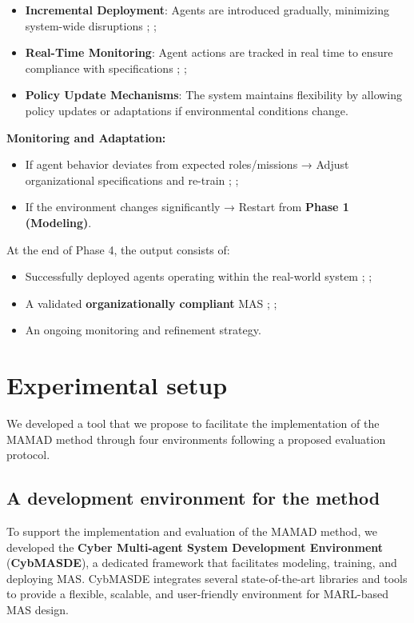 \documentclass[pdflatex,sn-mathphys-num]{sn-jnl}%
\theoremstyle{thmstyleone}%
\theoremstyle{thmstyletwo}%
\theoremstyle{thmstylethree}%
\begin{document}
\begin{itemize}
    \item \textbf{Incremental Deployment}: Agents are introduced gradually, minimizing system-wide disruptions ; ;
    \item \textbf{Real-Time Monitoring}: Agent actions are tracked in real time to ensure compliance with specifications ; ;
    \item \textbf{Policy Update Mechanisms}: The system maintains flexibility by allowing policy updates or adaptations if environmental conditions change.
\end{itemize}

\noindent \textbf{Monitoring and Adaptation:}
\begin{itemize}
    \item If agent behavior deviates from expected roles/missions → Adjust organizational specifications and re-train ; ;
    \item If the environment changes significantly → Restart from \textbf{Phase 1 (Modeling)}.
\end{itemize}

At the end of Phase 4, the output consists of:
\begin{itemize}
    \item Successfully deployed agents operating within the real-world system ; ;
    \item A validated \textbf{organizationally compliant} MAS ; ;
    \item An ongoing monitoring and refinement strategy.
\end{itemize}


\clearpage


\section{Experimental setup}
\label{sec:experimental_setup}

We developed a tool that we propose to facilitate the implementation of the MAMAD method through four environments following a proposed evaluation protocol.

\subsection{A development environment for the method}

To support the implementation and evaluation of the MAMAD method, we developed the \textbf{Cyber Multi-agent System Development Environment} (\textbf{CybMASDE}), a dedicated framework that facilitates modeling, training, and deploying MAS. CybMASDE integrates several state-of-the-art libraries and tools to provide a flexible, scalable, and user-friendly environment for MARL-based MAS design.
\end{document}
